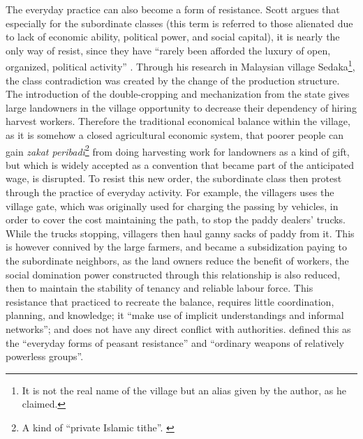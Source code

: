 The everyday practice can also become a form of resistance. Scott argues that especially for the subordinate classes (this term is referred to those alienated due to lack of economic ability, political power, and social capital), it is nearly the only way of resist, since they have ``rarely been afforded the luxury of open, organized, political activity'' \citep[p.~xv]{scott_weapons_2008}. Through his research in Malaysian village Sedaka\footnote{It is not the real name of the village but an alias given by the author, as he claimed.}, the class contradiction was created by the change of the production structure. The introduction of the double-cropping and mechanization from the state gives large landowners in the village opportunity to decrease their dependency of hiring harvest workers. Therefore the traditional economical balance within the village, as it is somehow a closed agricultural economic system, that poorer people can gain \textit{zakat peribadi}\footnote{A kind of ``private Islamic tithe''. \begingroup\mancite\citep[p.~121]{scott_weapons_2008}\endgroup} from doing harvesting work for landowners as a kind of gift, but which is widely accepted as a convention that became part of the anticipated wage, is disrupted. To resist this new order, the subordinate class then protest through the practice of everyday activity. For example, the villagers uses the village gate, which was originally used for charging the passing by vehicles, in order to cover the cost maintaining the path, to stop the paddy dealers' trucks. While the trucks stopping, villagers then haul ganny sacks of paddy from it. This is however connived by the large farmers, and became a subsidization paying to the subordinate neighbors, as the land owners reduce the benefit of workers, the social domination power constructed through this relationship is also reduced, then to maintain the stability of tenancy and reliable labour force. This resistance that practiced to recreate the balance, requires little coordination, planning, and knowledge; it ``make use of implicit understandings and informal networks''; and does not have any direct conflict with authorities. \citet[p.~xvi]{scott_weapons_2008} defined this as the ``everyday forms of peasant resistance'' and ``ordinary weapons of relatively powerless groups''.


